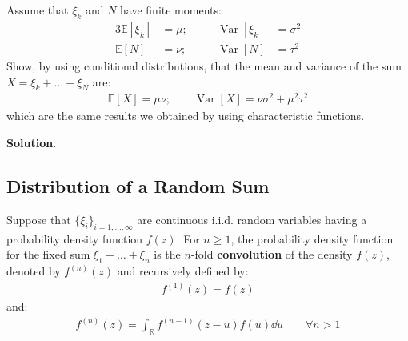 \documentclass[../template.tex]{subfiles}
\begin{document}
\begin{exo}
    Assume that $\xi_k$ and $N$ have finite moments:
    \begin{alignat*}{3}
        \mathbb{E}[\xi_k] &= \mu;\quad && \operatorname{Var}[\xi_k] &= \sigma^2 \\
        \mathbb{E}[N] &= \nu; && \operatorname{Var}[N] &= \tau^2 
    \end{alignat*}
    Show, by using conditional distributions, that the mean and variance of the sum $X= \xi_k + \dots + \xi_N$ are:
    \begin{align*}
        \mathbb{E}[X] = \mu \nu; \qquad \operatorname{Var}[X] = \nu \sigma^2 + \mu^2 \tau^2 
    \end{align*}
    which are the same results we obtained by using characteristic functions.

    \medskip

    \textbf{Solution}.  
\end{exo}

\subsection{Distribution of a Random Sum}
Suppose that $\{\xi_i\}_{i=1,\dots,\infty}$ are continuous i.i.d. random variables having a probability density function $f(z)$. For $n \geq 1$, the probability density function for the fixed sum $\xi_1 + \dots + \xi_n$ is the $n$-fold \textbf{convolution} of the density $f(z)$, denoted by $f^{(n)}(z)$ and recursively defined by:
\begin{align*}
    f^{(1)}(z) = f(z)
\end{align*} 
and:
\begin{align*}
    f^{(n)}(z) = \int_{\mathbb{R}} f^{(n-1)}(z-u)f(u)\dd{u} \qquad \forall n> 1
\end{align*}
\end{document}
